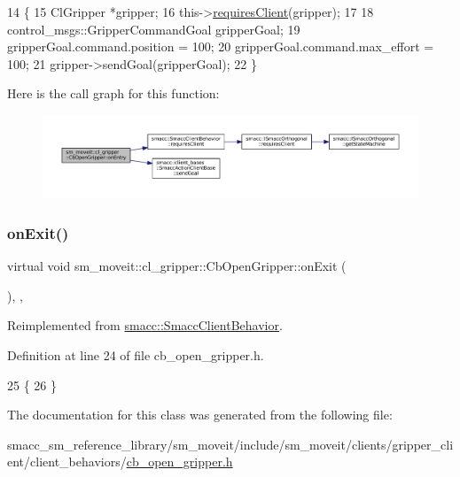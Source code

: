 \begin{DoxyCode}
14     \{
15         ClGripper *gripper;
16         this->\hyperlink{classsmacc_1_1SmaccClientBehavior_a917f001e763a1059af337bf4e164f542}{requiresClient}(gripper);
17 
18         control\_msgs::GripperCommandGoal gripperGoal;
19         gripperGoal.command.position = 100;
20         gripperGoal.command.max\_effort = 100;
21         gripper->sendGoal(gripperGoal);
22     \}
\end{DoxyCode}
Here is the call graph for this function\+:
\nopagebreak
\begin{figure}[H]
\begin{center}
\leavevmode
\includegraphics[width=350pt]{classsm__moveit_1_1cl__gripper_1_1CbOpenGripper_af601f6a5e2a280927a64b48100826b28_cgraph}
\end{center}
\end{figure}
\mbox{\label{classsm__moveit_1_1cl__gripper_1_1CbOpenGripper_a16cdbe39be1b1789880bae04fa87531c}} 
\subsubsection{\texorpdfstring{on\+Exit()}{onExit()}}
{\footnotesize\ttfamily virtual void sm\+\_\+moveit\+::cl\+\_\+gripper\+::\+Cb\+Open\+Gripper\+::on\+Exit (\begin{DoxyParamCaption}{ }\end{DoxyParamCaption})\hspace{0.3cm}{\ttfamily [inline]}, {\ttfamily [override]}, {\ttfamily [virtual]}}



Reimplemented from \hyperlink{classsmacc_1_1SmaccClientBehavior_ac0cd72d42bd00425362a97c9803ecce5}{smacc\+::\+Smacc\+Client\+Behavior}.



Definition at line 24 of file cb\+\_\+open\+\_\+gripper.\+h.


\begin{DoxyCode}
25     \{
26     \}
\end{DoxyCode}


The documentation for this class was generated from the following file\+:\begin{DoxyCompactItemize}
\item 
smacc\+\_\+sm\+\_\+reference\+\_\+library/sm\+\_\+moveit/include/sm\+\_\+moveit/clients/gripper\+\_\+client/client\+\_\+behaviors/\hyperlink{cb__open__gripper_8h}{cb\+\_\+open\+\_\+gripper.\+h}\end{DoxyCompactItemize}
